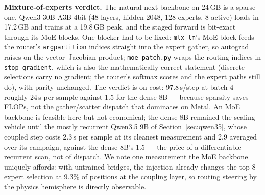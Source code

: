 \documentclass[11pt]{article}
\newcommand{\code}[1]{\texttt{#1}}
\begin{document}
\textbf{Mixture-of-experts verdict.} The natural next backbone on 24\,GB is a sparse one. Qwen3-30B-A3B-4bit \citep{qwen2025qwen3} (48 layers, hidden 2048, 128 experts, 8 active) loads in 17.2\,GB and trains at a 19.8\,GB peak, and the staged forward is bit-exact through its MoE blocks. One blocker had to be fixed: \code{mlx-lm}'s MoE block feeds the router's \code{argpartition} indices straight into the expert gather, so autograd raises on the vector--Jacobian product; \code{moe\_patch.py} wraps the routing indices in \code{stop\_gradient}, which is also the mathematically correct statement (discrete selections carry no gradient; the router's softmax scores and the expert paths still do), with parity unchanged. The verdict is on cost: 97.8\,s/step at batch 4 --- roughly 24\,s per sample against 1.5 for the dense 8B --- because sparsity saves FLOPs, not the gather/scatter dispatch that dominates on Metal. An MoE backbone is feasible here but not economical; the dense 8B remained the scaling vehicle until the mostly recurrent Qwen3.5 9B of Section~\ref{sec:qwen35}, whose coupled step costs 2.3\,s per sample at its cleanest measurement and 2.9 averaged over its campaign, against the dense 8B's 1.5 --- the price of a differentiable recurrent scan, not of dispatch. We note one measurement the MoE backbone uniquely affords: with untrained bridges, the injection already changes the top-8 expert selection at 9.3\% of positions at the coupling layer, so routing steering by the physics hemisphere is directly observable.
\end{document}
